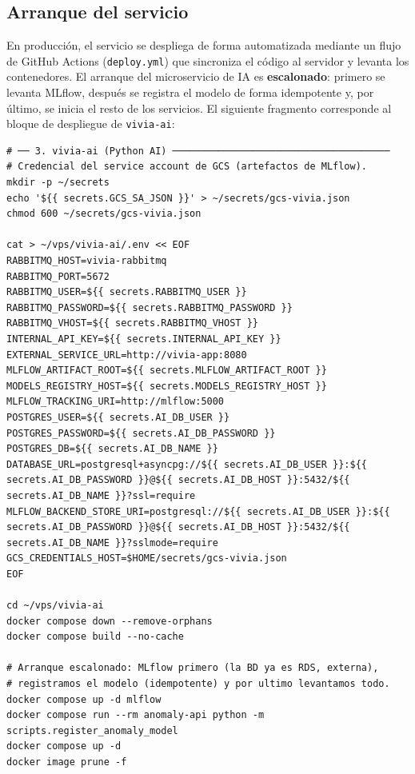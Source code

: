 \subsection{Arranque del servicio}

En producción, el servicio se despliega de forma automatizada mediante un flujo
de GitHub Actions (\texttt{deploy.yml}) que sincroniza el código al servidor y
levanta los contenedores. El arranque del microservicio de IA es
\textbf{escalonado}: primero se levanta MLflow, después se registra el modelo de
forma idempotente y, por último, se inicia el resto de los servicios. El
siguiente fragmento corresponde al bloque de despliegue de \texttt{vivia-ai}:

\begin{lstlisting}[style=bashstyle]
# ── 3. vivia-ai (Python AI) ──────────────────────────────────────
# Credencial del service account de GCS (artefactos de MLflow).
mkdir -p ~/secrets
echo '${{ secrets.GCS_SA_JSON }}' > ~/secrets/gcs-vivia.json
chmod 600 ~/secrets/gcs-vivia.json

cat > ~/vps/vivia-ai/.env << EOF
RABBITMQ_HOST=vivia-rabbitmq
RABBITMQ_PORT=5672
RABBITMQ_USER=${{ secrets.RABBITMQ_USER }}
RABBITMQ_PASSWORD=${{ secrets.RABBITMQ_PASSWORD }}
RABBITMQ_VHOST=${{ secrets.RABBITMQ_VHOST }}
INTERNAL_API_KEY=${{ secrets.INTERNAL_API_KEY }}
EXTERNAL_SERVICE_URL=http://vivia-app:8080
MLFLOW_ARTIFACT_ROOT=${{ secrets.MLFLOW_ARTIFACT_ROOT }}
MODELS_REGISTRY_HOST=${{ secrets.MODELS_REGISTRY_HOST }}
MLFLOW_TRACKING_URI=http://mlflow:5000
POSTGRES_USER=${{ secrets.AI_DB_USER }}
POSTGRES_PASSWORD=${{ secrets.AI_DB_PASSWORD }}
POSTGRES_DB=${{ secrets.AI_DB_NAME }}
DATABASE_URL=postgresql+asyncpg://${{ secrets.AI_DB_USER }}:${{ secrets.AI_DB_PASSWORD }}@${{ secrets.AI_DB_HOST }}:5432/${{ secrets.AI_DB_NAME }}?ssl=require
MLFLOW_BACKEND_STORE_URI=postgresql://${{ secrets.AI_DB_USER }}:${{ secrets.AI_DB_PASSWORD }}@${{ secrets.AI_DB_HOST }}:5432/${{ secrets.AI_DB_NAME }}?sslmode=require
GCS_CREDENTIALS_HOST=$HOME/secrets/gcs-vivia.json
EOF

cd ~/vps/vivia-ai
docker compose down --remove-orphans
docker compose build --no-cache

# Arranque escalonado: MLflow primero (la BD ya es RDS, externa),
# registramos el modelo (idempotente) y por ultimo levantamos todo.
docker compose up -d mlflow
docker compose run --rm anomaly-api python -m scripts.register_anomaly_model
docker compose up -d
docker image prune -f
\end{lstlisting}

